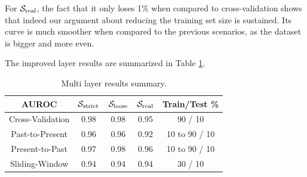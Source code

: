 For $\mathcal{S}_{\mathrm{real}}$, the fact that it only loses 1\% when compared to cross-validation shows that indeed our argument about reducing the training set size is sustained.
Its curve is much smoother when compared to the previous scenarios, as the dataset is bigger and more even.

\medskip

The improved layer results are summarized in Table \ref{tab:multilayer_results}.

\begin{table}[!htb]
	\renewcommand{\arraystretch}{1.2} %
	\centering
	\begin{tabular}{ccccc}
		AUROC & $\mathcal{S}_{\mathrm{strict}}$ & $\mathcal{S}_{\mathrm{loose}}$ & $\mathcal{S}_{\mathrm{real}}$ & Train/Test \%\\
		\hline
		Cross-Validation & 0.98 & 0.98 & 0.95 & 90 / 10\\
		Past-to-Present & 0.96 & 0.96 & 0.92 & 10 to 90 / 10\\
		Present-to-Past & 0.97 & 0.98 & 0.96 & 10 to 90 / 10\\
		Sliding-Window & 0.94 & 0.94 & 0.94 & 30 / 10\\
		\hline
	\end{tabular}
	\medskip
	\caption{Multi layer results summary.}
	\label{tab:multilayer_results}
\end{table}
